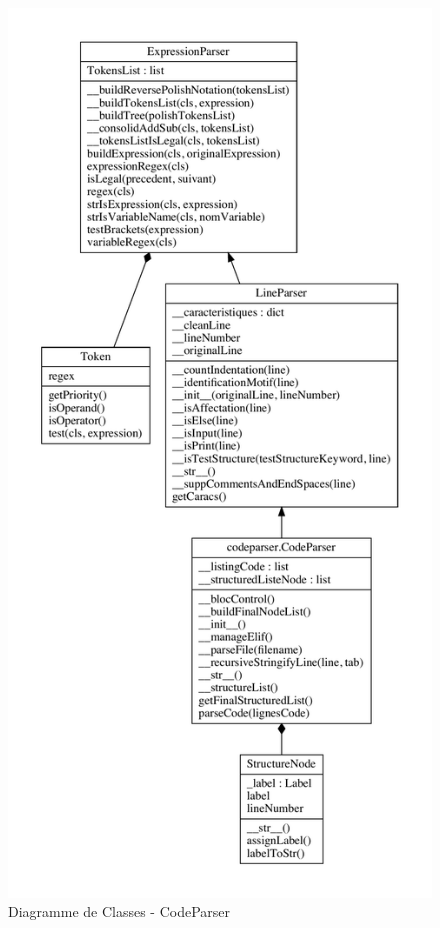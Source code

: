 \begin{figure}[p]
	\centering
	\includegraphics[scale=0.5]{./Pictures/LineParser.pdf}
	\caption{\label{fig:class-CodeParser}Diagramme de Classes - CodeParser}
\end{figure}

